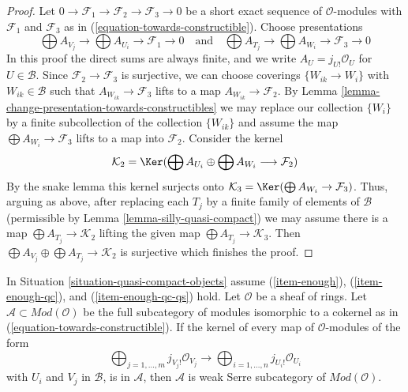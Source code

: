 \begin{proof}
Let $0 \to \mathcal{F}_1 \to \mathcal{F}_2 \to \mathcal{F}_3 \to 0$
be a short exact sequence of $\mathcal{O}$-modules with
$\mathcal{F}_1$ and $\mathcal{F}_3$ as in
(\ref{equation-towards-constructible}). Choose presentations
$$
\bigoplus A_{V_j} \to \bigoplus A_{U_i} \to \mathcal{F}_1 \to 0
\quad\text{and}\quad
\bigoplus A_{T_j} \to \bigoplus A_{W_i} \to \mathcal{F}_3 \to 0
$$
In this proof the direct sums are always finite, and
we write $A_U = j_{U!}\mathcal{O}_U$ for $U \in \mathcal{B}$.
Since $\mathcal{F}_2 \to \mathcal{F}_3$ is surjective, we can
choose coverings $\{W_{ik} \to W_i\}$ with $W_{ik} \in \mathcal{B}$
such that $A_{W_{ik}} \to \mathcal{F}_3$ lifts to a map
$A_{W_{ik}} \to \mathcal{F}_2$.
By Lemma \ref{lemma-change-presentation-towards-constructibles}
we may replace our collection $\{W_i\}$ by a finite subcollection
of the collection $\{W_{ik}\}$ and assume the map
$\bigoplus A_{W_i} \to \mathcal{F}_3$ lifts to a map into $\mathcal{F}_2$.
Consider the kernel
$$
\mathcal{K}_2 = \Ker(\bigoplus A_{U_i} \oplus \bigoplus A_{W_i}
\longrightarrow \mathcal{F}_2)
$$
By the snake lemma this kernel surjects onto
$\mathcal{K}_3 = \Ker(\bigoplus A_{W_i} \to \mathcal{F}_3)$.
Thus, arguing as above, after replacing each $T_j$ by a finite family of
elements of $\mathcal{B}$ (permissible by
Lemma \ref{lemma-silly-quasi-compact})
we may assume there is a map
$\bigoplus A_{T_j} \to \mathcal{K}_2$ lifting the given map
$\bigoplus A_{T_j} \to \mathcal{K}_3$.
Then $\bigoplus A_{V_j} \oplus \bigoplus A_{T_j} \to \mathcal{K}_2$
is surjective which finishes the proof.
\end{proof}

\begin{lemma}
\label{lemma-towards-constructible-when-serre-subcategory}
In Situation \ref{situation-quasi-compact-objects} assume
(\ref{item-enough}), (\ref{item-enough-qc}), and (\ref{item-enough-qc-qs})
hold. Let $\mathcal{O}$ be a sheaf of rings.
Let $\mathcal{A} \subset \textit{Mod}(\mathcal{O})$ be the full
subcategory of modules isomorphic to a cokernel as in
(\ref{equation-towards-constructible}).
If the kernel of every map of $\mathcal{O}$-modules of the form
$$
\bigoplus\nolimits_{j = 1, \ldots, m} j_{V_j!}\mathcal{O}_{V_j}
\longrightarrow
\bigoplus\nolimits_{i = 1, \ldots, n} j_{U_i!}\mathcal{O}_{U_i}
$$
with $U_i$ and $V_j$ in $\mathcal{B}$, is in $\mathcal{A}$, then
$\mathcal{A}$ is weak Serre subcategory of $\textit{Mod}(\mathcal{O})$.
\end{lemma}

